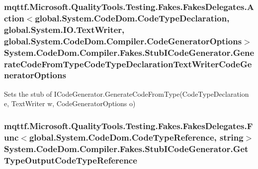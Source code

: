 \hypertarget{class_system_1_1_code_dom_1_1_compiler_1_1_fakes_1_1_stub_i_code_generator_a2321da544662fce1770a94c2c2b10f2a}{
\subsubsection[{Generate\-Code\-From\-Type\-Code\-Type\-Declaration\-Text\-Writer\-Code\-Generator\-Options}]{\setlength{\rightskip}{0pt plus 5cm}mqttf.\-Microsoft.\-Quality\-Tools.\-Testing.\-Fakes.\-Fakes\-Delegates.\-Action$<$global.\-System.\-Code\-Dom.\-Code\-Type\-Declaration, global.\-System.\-I\-O.\-Text\-Writer, global.\-System.\-Code\-Dom.\-Compiler.\-Code\-Generator\-Options$>$ System.\-Code\-Dom.\-Compiler.\-Fakes.\-Stub\-I\-Code\-Generator.\-Generate\-Code\-From\-Type\-Code\-Type\-Declaration\-Text\-Writer\-Code\-Generator\-Options}}\label{class_system_1_1_code_dom_1_1_compiler_1_1_fakes_1_1_stub_i_code_generator_a2321da544662fce1770a94c2c2b10f2a}


Sets the stub of I\-Code\-Generator.\-Generate\-Code\-From\-Type(\-Code\-Type\-Declaration e, Text\-Writer w, Code\-Generator\-Options o)

\hypertarget{class_system_1_1_code_dom_1_1_compiler_1_1_fakes_1_1_stub_i_code_generator_abb2de69913378e5f8ab1d4a7da69626a}{
\subsubsection[{Get\-Type\-Output\-Code\-Type\-Reference}]{\setlength{\rightskip}{0pt plus 5cm}mqttf.\-Microsoft.\-Quality\-Tools.\-Testing.\-Fakes.\-Fakes\-Delegates.\-Func$<$global.\-System.\-Code\-Dom.\-Code\-Type\-Reference, string$>$ System.\-Code\-Dom.\-Compiler.\-Fakes.\-Stub\-I\-Code\-Generator.\-Get\-Type\-Output\-Code\-Type\-Reference}}\label{class_system_1_1_code_dom_1_1_compiler_1_1_fakes_1_1_stub_i_code_generator_abb2de69913378e5f8ab1d4a7da69626a}


